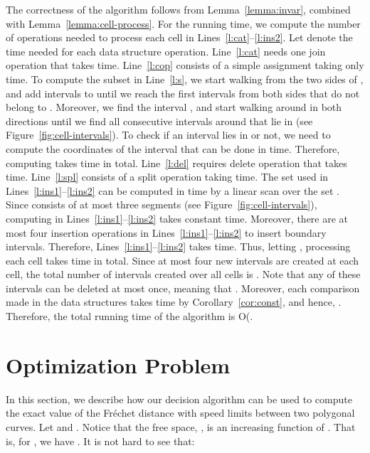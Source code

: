 \documentclass[12pt]{dalthesis}
\def\favoritefont{\bfseries \sffamily}
\def\QED{\ensuremath{{\Box}}}
\def\markatright#1{\leavevmode\unskip\nobreak\quad\hspace*{\fill}{#1}}
\newenvironment{proof}
	{\begin{trivlist}\item[\hskip\labelsep{\favoritefont Proof:}]}
	{\markatright{\QED}\end{trivlist}}
\newcommand{\Frechet}{Fr\'echet }
\begin{document}
\begin{proof}
	The correctness of the algorithm follows from Lemma~\ref{lemma:invar},
	combined with Lemma~\ref{lemma:cell-process}.
	For the running time, we compute the number of operations
	needed to process each cell  in Lines~\ref{l:cat}--\ref{l:ins2}.
	Let  denote the time needed for each data structure operation.
	Line~\ref{l:cat} needs one join operation that takes  time.
	Line~\ref{l:cop} consists of a simple assignment taking only  time.
	To compute the subset  in Line~\ref{l:s}, we start walking from 
	the two sides of , and add intervals to  until we reach 
	the first intervals from both sides that do not belong to .
	Moreover, we find the interval , 
	and start walking around  in both directions until we find all consecutive intervals around  
	that lie in  (see Figure~\ref{fig:cell-intervals}).
	To check if an interval lies in  or not, we need to compute the coordinates
	of the interval that can be done in  time.
	Therefore, computing  takes  time in total.
	Line~\ref{l:del} requires  delete operation that takes  time.
	Line~\ref{l:spl} consists of a split operation taking  time.
	The set  used in Lines~\ref{l:ins1}--\ref{l:ins2}
	can be computed in  time by a linear scan over the set .
	Since  consists of at most three segments (see Figure~\ref{fig:cell-intervals}),
	computing  in Lines~\ref{l:ins1}--\ref{l:ins2} takes constant time.
	Moreover, there are at most four insertion operations in Lines~\ref{l:ins1}--\ref{l:ins2}
	to insert boundary intervals.
	Therefore, Lines~\ref{l:ins1}--\ref{l:ins2} takes   time.
	Thus, letting ,
	processing each cell  takes  time in total.
	Since at most four new intervals are created at each cell,
	the total number of intervals created over all cells is .
	Note that any of these  intervals can be deleted at most once,
	meaning that . 
	Moreover, 	each comparison made in the data structures 
	takes  time by Corollary~\ref{cor:const},
	and hence, .
	Therefore, the total running time of the algorithm is 
	O(.
\end{proof}







\section{Optimization Problem} \label{sec:optimization}


In this section, we describe how our decision algorithm can be used to 
compute the exact value of the \Frechet distance with speed limits between two polygonal curves. 
Let  and  .
Notice that the free space, , is an increasing function of .
That is, for , we have .
It is not hard to see that:
\end{document}
